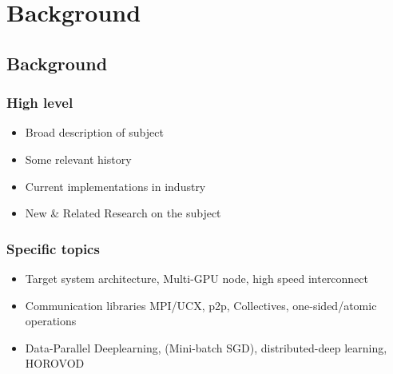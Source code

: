 
\glsresetall %
\chapter[Background]{Background}\label{ch:Background}

\section{Background}
\subsection{High level}
\begin{itemize}
	\item{Broad description of subject}
	\item{Some relevant history}
	\item{Current implementations in industry}
	\item{New \& Related Research on the subject}
\end{itemize}

\subsection{Specific topics}
\begin{itemize}
    \item Target system architecture, Multi-GPU node, high speed interconnect
    \item Communication libraries MPI/UCX, p2p, Collectives, one-sided/atomic operations \cite{mpi40, gabriel2004OpenMPI, MPICH, shamis2015ucx}
    \item Data-Parallel Deeplearning, (Mini-batch SGD), distributed-deep learning, HOROVOD \cite{Ben-Nun2019DemystifyDL, Sergeev2018Horovod}
\end{itemize}

\clearpage


